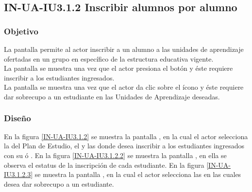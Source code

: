 \subsection{IN-UA-IU3.1.2 Inscribir alumnos por alumno}

\subsubsection{Objetivo}
	La pantalla  permite al actor inscribir a un alumno a las unidades de aprendizaje ofertadas en un grupo en específico de la estructura educativa vigente.\\
	La pantalla  se muestra una vez que el actor presiona el botón  y éste requiere inscribir a los estudiantes ingresados.\\
	La pantalla  se muestra una vez que el actor da clic sobre el ícono {\IUPila} y éste requiere dar sobrecupo a un estudiante en las Unidades de Aprendizaje deseadas.

\subsubsection{Diseño}
	En la figura \ref{IN-UA-IU3.1.2} se muestra la pantalla , en la cual el actor selecciona la  del Plan de Estudio, el  y las  donde desea inscribir a los estudiantes ingresados con su  ó .
	En la figura \ref{IN-UA-IU3.1.2.2} se muestra la pantalla , en ella se observa el estatus de la inscripción de cada estudiante.
	En la figura \ref{IN-UA-IU3.1.2.3} se muestra la pantalla , en la cual el actor selecciona las  en las cuales desea dar sobrecupo a un estudiante.
	
	
